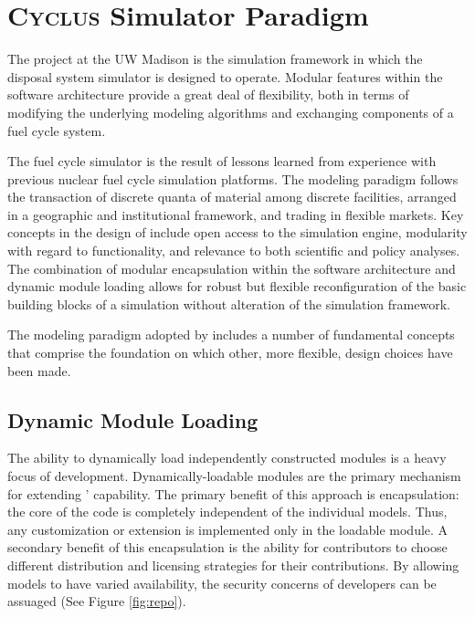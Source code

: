 \section{\textsc{Cyclus} Simulator Paradigm }

The \Cyclus project \cite{wilson_cyclus:_2012} at the \gls{UW} Madison is the 
simulation framework in which the \Cyder disposal system simulator is designed 
to operate.  Modular features within the \Cyclus software architecture provide 
a great deal of flexibility, both in terms of modifying the underlying modeling 
algorithms and exchanging components of a fuel cycle system.

The \Cyclus fuel cycle simulator is the  result of lessons learned 
from experience with previous nuclear fuel cycle simulation platforms.  
The modeling paradigm follows the transaction of discrete quanta of 
material among discrete facilities, arranged in a geographic and 
institutional framework, and trading in
flexible markets. Key concepts in the design of \Cyclus include open
access to the simulation engine, modularity with regard to
functionality, and relevance to both scientific and policy
analyses. The combination of modular encapsulation within the
software architecture and dynamic module loading allows for robust but 
flexible reconfiguration of the basic building blocks of a simulation 
without alteration of the simulation framework.  

The modeling paradigm adopted by \Cyclus includes a number of
fundamental concepts that comprise the foundation on which other, more
flexible, design choices have been made. 

\subsection{Dynamic Module Loading}

The ability to dynamically load independently constructed modules is a
heavy focus of \Cyclus development. Dynamically-loadable modules are
the primary mechanism for extending \Cyclus' capability. The primary
benefit of this approach is encapsulation: the core of the code is
completely independent of the individual models. Thus, any
customization or extension is implemented only in the loadable
module. A secondary benefit of this encapsulation is the ability for
contributors to choose different distribution and licensing strategies
for their contributions. By allowing models to have varied
availability, the security concerns of developers can be
assuaged (See Figure \ref{fig:repo}). 

